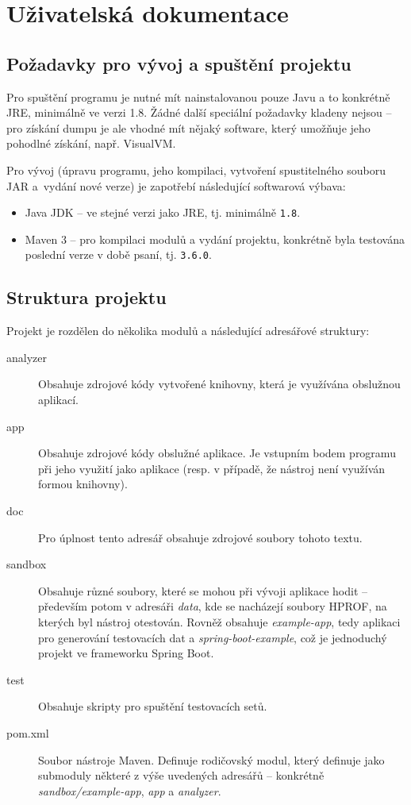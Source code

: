 \chapter{Uživatelská dokumentace}
\label{usage-doc}
\section{Požadavky pro vývoj a spuštění projektu}
Pro spuštění programu je nutné mít nainstalovanou pouze Javu a to konkrétně JRE, minimálně ve verzi 1.8. Žádné další speciální požadavky kladeny nejsou -- pro získání dumpu je ale vhodné mít nějaký software, který umožňuje jeho pohodlné získání, např. VisualVM.

Pro vývoj (úpravu programu, jeho kompilaci, vytvoření spustitelného souboru JAR a~vydání nové verze) je zapotřebí následující softwarová výbava:
\begin{itemize}
    \item Java JDK -- ve stejné verzi jako JRE, tj. minimálně \texttt{1.8}.
    \item Maven 3 -- pro kompilaci modulů a vydání projektu, konkrétně byla testována poslední verze v době psaní, tj. \texttt{3.6.0}.
\end{itemize}

\section{Struktura projektu}
Projekt je rozdělen do několika modulů a následující adresářové struktury:

\begin{description}
    \item[analyzer] Obsahuje zdrojové kódy vytvořené knihovny, která je využívána obslužnou aplikací.
    \item[app] Obsahuje zdrojové kódy obslužné aplikace. Je vstupním bodem programu při jeho využití jako aplikace (resp. v případě, že nástroj není využíván formou knihovny).
    \item[doc] Pro úplnost tento adresář obsahuje zdrojové soubory tohoto textu.
    \item[sandbox] Obsahuje různé soubory, které se mohou při vývoji aplikace hodit -- především potom v adresáři \textit{data}, kde se nacházejí soubory HPROF, na kterých byl nástroj otestován. Rovněž obsahuje \textit{example-app}, tedy aplikaci pro generování testovacích dat a \textit{spring-boot-example}, což je jednoduchý projekt ve frameworku Spring Boot.
    \item[test] Obsahuje skripty pro spuštění testovacích setů.
    \item[pom.xml] Soubor nástroje Maven. Definuje rodičovský modul, který definuje jako submoduly některé z výše uvedených adresářů -- konkrétně \textit{sandbox/example-app}, \textit{app} a \textit{analyzer}.
\end{description}

